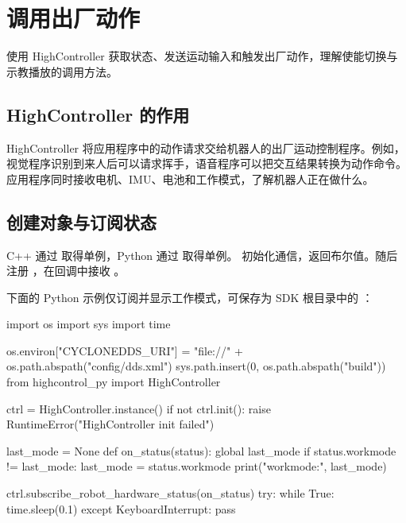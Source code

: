 \chapter{调用出厂动作}

\label{chap:high}
\begin{intro}
使用 HighController 获取状态、发送运动输入和触发出厂动作，理解使能切换与示教播放的调用方法。
\end{intro}
\section{HighController 的作用}
HighController 将应用程序中的动作请求交给机器人的出厂运动控制程序。例如，视觉程序识别到来人后可以请求挥手，语音程序可以把交互结果转换为动作命令。应用程序同时接收电机、IMU、电池和工作模式，了解机器人正在做什么。
\section{创建对象与订阅状态}
C++ 通过  取得单例，Python 通过  取得单例。 初始化通信，返回布尔值。随后注册 ，在回调中接收 。

下面的 Python 示例仅订阅并显示工作模式，可保存为 SDK 根目录中的 ：
\par\noindent\begin{minipage}{\linewidth}
\begin{command}
import os
import sys
import time

os.environ["CYCLONEDDS_URI"] = "file://" + os.path.abspath("config/dds.xml")
sys.path.insert(0, os.path.abspath("build"))
from highcontrol_py import HighController

ctrl = HighController.instance()
if not ctrl.init():
    raise RuntimeError("HighController init failed")

last_mode = None
def on_status(status):
    global last_mode
    if status.workmode != last_mode:
        last_mode = status.workmode
        print("workmode:", last_mode)

ctrl.subscribe_robot_hardware_status(on_status)
try:
    while True:
        time.sleep(0.1)
except KeyboardInterrupt:
    pass
\end{command}
\end{minipage}\par

